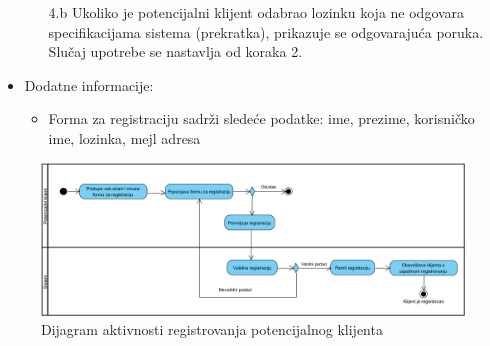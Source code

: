 \begin{itemize}
\begin{itemize}
            \item[4.b] Ukoliko je potencijalni klijent odabrao lozinku koja ne odgovara specifikacijama sistema (prekratka), prikazuje se odgovarajuća poruka. Slučaj upotrebe se nastavlja od koraka 2.
        \end{itemize}
    \item Dodatne informacije:
    \begin{itemize}
        \item Forma za registraciju sadrži sledeće podatke: ime, prezime, korisničko ime, lozinka, mejl adresa
    \end{itemize}
\end{itemize}

\begin{figure}[H]
\begin{center}
\includegraphics[width=\textwidth]{Pictures/activity_client_registration.png}
\end{center}
    \caption{Dijagram aktivnosti registrovanja potencijalnog klijenta}
\label{fig:ActivityClientRegistration}
\end{figure}
